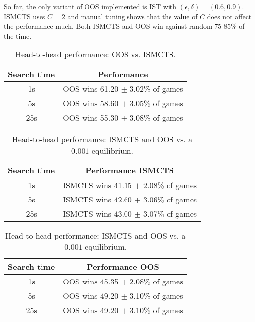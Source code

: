 \documentclass[letterpaper]{article}
\begin{document}
So far, the only variant of OOS implemented is IST with $(\epsilon, \delta) = (0.6, 0.9)$. 
ISMCTS uses $C = 2$ and manual tuning shows that the value of $C$ does not 
affect the performance much. Both ISMCTS and OOS win against random 75-85\% of the time.

\begin{table}[h!]
\begin{center}
\begin{tabular}{|c|c|}
\hline
Search time & Performance \\
\hline
    1s      & OOS wins 61.20 $\pm$ 3.02\% of games \\
    5s      & OOS wins 58.60 $\pm$ 3.05\% of games \\
    25s     & OOS wins 55.30 $\pm$ 3.08\% of games \\
\hline
\end{tabular}
\caption{Head-to-head performance: OOS vs. ISMCTS.}
\end{center}
\end{table}

\begin{table}[h!]
\begin{center}
\begin{tabular}{|c|c|}
\hline
Search time & Performance ISMCTS \\
\hline
    1s      & ISMCTS wins 41.15 $\pm$ 2.08\% of games \\
    5s      & ISMCTS wins 42.60 $\pm$ 3.06\% of games \\
    25s     & ISMCTS wins 43.00 $\pm$ 3.07\% of games \\
\hline
\end{tabular}

\vspace{0.3cm}

\begin{tabular}{|c|c|}
\hline
Search time & Performance OOS \\
\hline
    1s      & OOS wins 45.35 $\pm$ 2.08\% of games \\
    5s      & OOS wins 49.20 $\pm$ 3.10\% of games \\
    25s     & OOS wins 49.20 $\pm$ 3.10\% of games \\
\hline
\end{tabular}
\caption{Head-to-head performance: ISMCTS and OOS vs. a $0.001$-equilibrium. }
\end{center}
\end{table}

% 
%
%
%
%
\end{document}
